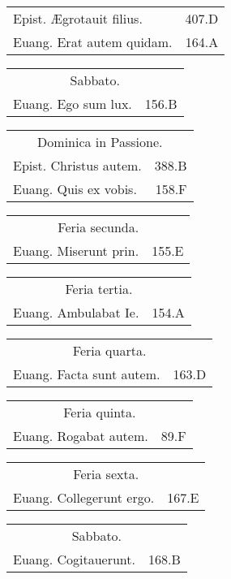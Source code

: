\documentclass[a5paper,10pt]{book}
\def\AE{Æ}
\begin{document}
\begin{multicols}{2}
\begin{tabular}{l r}
Epist. \AE grotauit filius. & 407.D\\
Euang. Erat autem quidam. & 164.A\\
\end{tabular}
\begin{tabular}{l r}
\multicolumn{2}{c}{\color{red} Sabbato.}\\
Euang. Ego sum lux. & 156.B\\
\end{tabular}
\begin{tabular}{l r}
\multicolumn{2}{c}{\color{red} Dominica in Passione.}\\
Epist. Christus autem. & 388.B\\
Euang. Quis ex vobis. & 158.F\\
\end{tabular}
\begin{tabular}{l r}
\multicolumn{2}{c}{\color{red} Feria secunda.}\\
Euang. Miserunt prin. & 155.E\\
\end{tabular}
\begin{tabular}{l r}
\multicolumn{2}{c}{\color{red} Feria tertia.}\\
Euang. Ambulabat Ie. & 154.A\\
\end{tabular}
\begin{tabular}{l r}
\multicolumn{2}{c}{\color{red} Feria quarta.}\\
Euang. Facta sunt autem. & 163.D\\
\end{tabular}
\begin{tabular}{l r}
\multicolumn{2}{c}{\color{red} Feria quinta.}\\
Euang. Rogabat autem. & 89.F\\
\end{tabular}
\begin{tabular}{l r}
\multicolumn{2}{c}{\color{red} Feria sexta.}\\
Euang. Collegerunt ergo. & 167.E\\
\end{tabular}
\begin{tabular}{l r}
\multicolumn{2}{c}{\color{red} Sabbato.}\\
Euang. Cogitauerunt. & 168.B\\
\end{tabular}
\par
\vspace{-.5em}
\begin{tabular}{c}

\end{tabular}
\end{multicols}
\end{document}

